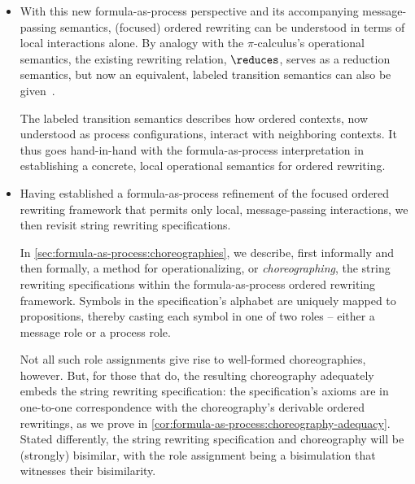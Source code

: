 \begin{itemize}[listparindent=\parindent, itemsep=\dimexpr\itemsep+\parsep\relax, parsep=0pt]

\item
  With this new formula-as-process perspective and its accompanying mes\-sage-passing semantics, (focused) ordered rewriting can be understood in terms of local interactions alone.
  By analogy with the $\pi$-calculus's operational semantics, the existing rewriting relation, $\reduces$, serves as a reduction semantics, but now an equivalent, labeled transition semantics can also be given~.

  The labeled transition semantics describes how ordered contexts, now understood as process configurations, interact with neighboring contexts.
  It thus goes hand-in-hand with the formula-as-process interpretation in establishing a concrete, local operational semantics for ordered rewriting.

\item
  Having established a formula-as-process refinement of the focused ordered rewriting framework that permits only local, message-passing interactions, we then revisit string rewriting specifications.

  In \cref{sec:formula-as-process:choreographies}, we describe, first informally and then formally, a method for operationalizing, or \emph{choreographing}, the string rewriting specifications within the formula-as-process ordered rewriting framework.
  Symbols in the specification's alphabet are uniquely mapped to propositions, thereby casting each symbol in one of two roles -- either a message role or a process role.

  Not all such role assignments give rise to well-formed choreographies, however.
  But, for those that do, the resulting choreography adequately embeds the string rewriting specification:
  the specification's axioms are in one-to-one correspondence with the choreography's derivable ordered rewritings, as we prove in \cref{cor:formula-as-process:choreography-adequacy}.
  Stated differently, the string rewriting specification and choreography will be (strongly) bisimilar, with the role assignment being a bisimulation that witnesses their bisimilarity.


\end{itemize}
